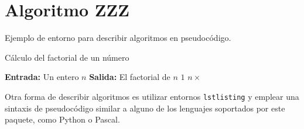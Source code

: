\section{Algoritmo ZZZ}
\label{Apendice1:ZZZ}

\noindent Ejemplo de entorno para describir algoritmos en pseudocódigo.

\begin{algorithm}[htpb]
    \caption{Cálculo del factorial de un número}\label{alg:factorial}
    \begin{algorithmic}[1]
        \State \textbf{Entrada:} Un entero $n$
        \State \textbf{Salida:} El factorial de $n$
                \State \Return $1$
            \Else
                \State \Return $n \times$ 
            \EndIf
        \EndFunction
    \end{algorithmic}
\end{algorithm}

Otra forma de describir algoritmos es utilizar entornos \texttt{lstlisting} y emplear una sintaxis de pseudocódigo similar a alguno de los lenguajes soportados por este paquete, como Python o Pascal.